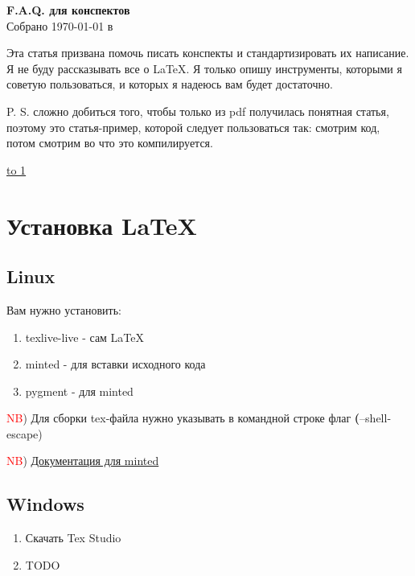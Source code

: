 \documentclass[12pt]{article}
\begin{document}
    \begin{center}

    {\Large \bf F.A.Q. для конспектов} \\
    \vspace{0.5em}
    {\large Собрано {\today} в {\currenttime}}

    Эта статья призвана помочь писать конспекты и стандартизировать их написание. Я не буду рассказывать все о LaTeX. Я только опишу инструменты, которыми я советую пользоваться, и которых я надеюсь вам будет достаточно.


    P. S. сложно добиться того, чтобы только из pdf получилась понятная статья, поэтому это статья-пример, которой следует пользоваться так: смотрим код, потом смотрим во что это компилируется.

    \end{center}
\underline{\hbox to 1\textwidth{{ } \hfil{ } \hfil{ } }}

\tableofcontents

\newpage

\section{Установка LaTeX}

\subsection{Linux}

Вам нужно установить:
\begin{enumerate}
    \item texlive-live - сам LaTeX
    \item minted - для вставки исходного кода
    \item pygment - для minted
\end{enumerate}


\textcolor{red}{NB}) Для сборки tex-файла нужно указывать в командной строке флаг \textbf(--shell-escape)


\textcolor{red}{NB}) \href{http://tug.ctan.org/macros/latex/contrib/minted/minted.pdf}{Документация для minted}

\subsection{Windows}
\begin{enumerate}
\item Скачать Tex Studio
\item TODO
\end{enumerate}
\end{document}
